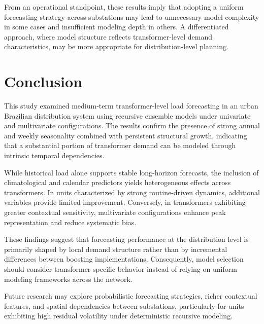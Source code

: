 From an operational standpoint, these results imply that adopting a uniform forecasting strategy across substations may lead to unnecessary model complexity in some cases and insufficient modeling depth in others. A differentiated approach, where model structure reflects transformer-level demand characteristics, may be more appropriate for distribution-level planning.


\section{Conclusion}
\label{sec:conclusion}

This study examined medium-term transformer-level load forecasting in an urban Brazilian distribution system using recursive ensemble models under univariate and multivariate configurations. The results confirm the presence of strong annual and weekly seasonality combined with persistent structural growth, indicating that a substantial portion of transformer demand can be modeled through intrinsic temporal dependencies.

While historical load alone supports stable long-horizon forecasts, the inclusion of climatological and calendar predictors yields heterogeneous effects across transformers. In units characterized by strong routine-driven dynamics, additional variables provide limited improvement. Conversely, in transformers exhibiting greater contextual sensitivity, multivariate configurations enhance peak representation and reduce systematic bias.

These findings suggest that forecasting performance at the distribution level is primarily shaped by local demand structure rather than by incremental differences between boosting implementations. Consequently, model selection should consider transformer-specific behavior instead of relying on uniform modeling frameworks across the network.

Future research may explore probabilistic forecasting strategies, richer contextual features, and spatial dependencies between substations, particularly for units exhibiting high residual volatility under deterministic recursive modeling.




